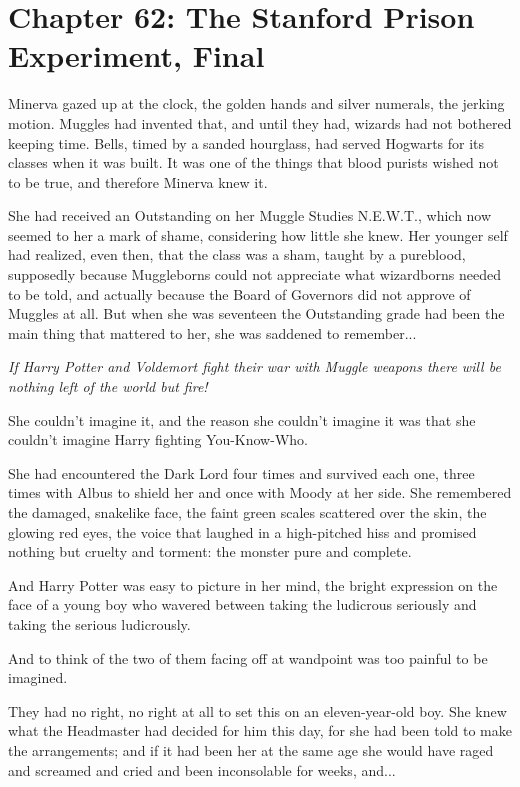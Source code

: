 \chapter{Chapter 62: The Stanford Prison Experiment, Final}
Minerva gazed up at the clock, the golden hands and silver numerals, the jerking motion. Muggles had invented that, and until they had, wizards had not bothered keeping time. Bells, timed by a sanded hourglass, had served Hogwarts for its classes when it was built. It was one of the things that blood purists wished not to be true, and therefore Minerva knew it.

She had received an Outstanding on her Muggle Studies N.E.W.T., which now seemed to her a mark of shame, considering how little she knew. Her younger self had realized, even then, that the class was a sham, taught by a pureblood, supposedly because Muggleborns could not appreciate what wizardborns needed to be told, and actually because the Board of Governors did not approve of Muggles at all. But when she was seventeen the Outstanding grade had been the main thing that mattered to her, she was saddened to remember...

\emph{If Harry Potter and Voldemort fight their war with Muggle weapons there will be nothing left of the world but fire!}

She couldn't imagine it, and the reason she couldn't imagine it was that she couldn't imagine Harry fighting You-Know-Who.

She had encountered the Dark Lord four times and survived each one, three times with Albus to shield her and once with Moody at her side. She remembered the damaged, snakelike face, the faint green scales scattered over the skin, the glowing red eyes, the voice that laughed in a high-pitched hiss and promised nothing but cruelty and torment: the monster pure and complete.

And Harry Potter was easy to picture in her mind, the bright expression on the face of a young boy who wavered between taking the ludicrous seriously and taking the serious ludicrously.

And to think of the two of them facing off at wandpoint was too painful to be imagined.

They had no right, no right at all to set this on an eleven-year-old boy. She knew what the Headmaster had decided for him this day, for she had been told to make the arrangements; and if it had been her at the same age she would have raged and screamed and cried and been inconsolable for weeks, and...

